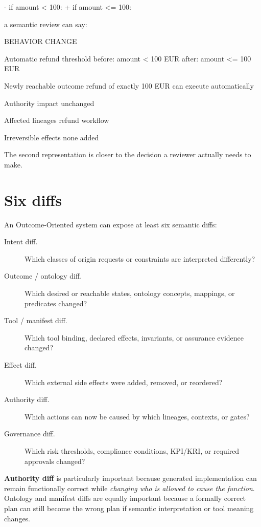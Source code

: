 \documentclass[10pt,oneside,openany]{book}
\begin{document}
\begin{codeblock}
- if amount < 100:
+ if amount <= 100:
\end{codeblock}

a semantic review can say:

\begin{codeblock}
BEHAVIOR CHANGE

Automatic refund threshold
  before: amount < 100 EUR
  after:  amount <= 100 EUR

Newly reachable outcome
  refund of exactly 100 EUR can execute automatically

Authority impact
  unchanged

Affected lineages
  refund workflow

Irreversible effects
  none added
\end{codeblock}

The second representation is closer to the decision a reviewer actually needs to make.

\section{Six diffs}
An Outcome-Oriented system can expose at least six semantic diffs:

\begin{description}
\item[Intent diff.] Which classes of origin requests or constraints are interpreted differently?
\item[Outcome / ontology diff.] Which desired or reachable states, ontology concepts, mappings, or predicates changed?
\item[Tool / manifest diff.] Which tool binding, declared effects, invariants, or assurance evidence changed?
\item[Effect diff.] Which external side effects were added, removed, or reordered?
\item[Authority diff.] Which actions can now be caused by which lineages, contexts, or gates?
\item[Governance diff.] Which risk thresholds, compliance conditions, KPI/KRI, or required approvals changed?
\end{description}

\textbf{Authority diff} is particularly important because generated implementation can remain functionally correct while \emph{changing who is allowed to cause the function}. Ontology and manifest diffs are equally important because a formally correct plan can still become the wrong plan if semantic interpretation or tool meaning changes.
\end{document}
